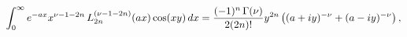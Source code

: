 \[\int_{0}^{\infty}e^{-ax}x^{\nu-1-2n}\mathop{L^{(\nu-1-2n)}_{2n}\/}\nolimits\!%
\left(ax\right)\mathop{\cos\/}\nolimits\!\left(xy\right)dx=\frac{(-1)^{n}%
\mathop{\Gamma\/}\nolimits\!\left(\nu\right)}{2(2n)!}y^{2n}\left((a+iy)^{-\nu}%
+(a-iy)^{-\nu}\right),\]